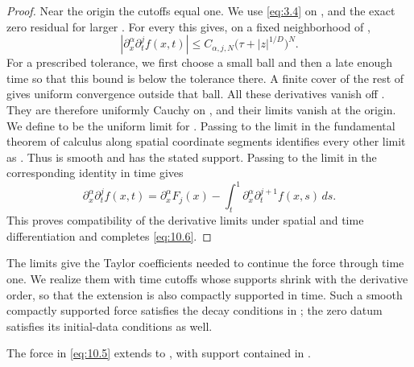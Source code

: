 \begin{proof}
Near the origin the cutoffs equal one. We use \eqref{eq:3.4} on
, and the exact zero residual for larger
. For every  this gives, on a fixed
neighborhood of ,
\begin{equation}
|\partial_x^\alpha\partial_t^jf(x,t)|
\leq C_{\alpha,j,N}\bigl(\tau+|z|^{1/D}\bigr)^N.
\tag{10.9}\label{eq:10.9}
\end{equation}
For a prescribed tolerance, we first choose a small ball and then a late enough time so that this
bound is below the tolerance there. A finite cover of the rest of  gives
uniform convergence outside that ball. All these derivatives vanish off
. They are therefore uniformly Cauchy on
, and their limits vanish at the origin.
%
We define  to be the uniform limit for
. Passing to the limit in the fundamental theorem of calculus along
spatial coordinate segments identifies every other limit as
. Thus  is smooth and has
the stated support. Passing to the limit in the corresponding identity in time gives
\begin{equation}
\partial_x^\alpha\partial_t^jf(x,t)
=\partial_x^\alpha F_j(x)-\int_t^1\partial_x^\alpha\partial_t^{j+1}f(x,s)\,ds.
\tag{10.10}\label{eq:10.10}
\end{equation}
This proves compatibility of the derivative limits under spatial and time differentiation and
completes \eqref{eq:10.6}.
\end{proof}

The limits  give the Taylor coefficients needed to continue the force
through time one. We realize them with time cutoffs whose supports shrink with the derivative order,
so that the extension is also compactly supported in time. Such a smooth compactly supported force
satisfies the decay conditions in \cite[(5)]{ref-13}; the zero datum satisfies its initial-data
conditions as well.

\begin{lemma}\label{lem:10.3}
The force in \eqref{eq:10.5} extends to
, with support
contained in .
\end{lemma}

